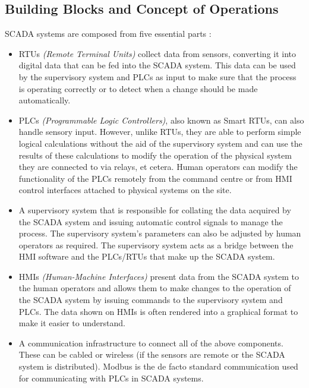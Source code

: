 \subsection{Building Blocks and Concept of Operations}
SCADA systems are composed from five essential parts \citep{site:allaboutcircuits:scadaintro:20150831,site:infosecinst:scadacritical:20130222}:
\begin{itemize}
  \item RTUs \textit{(Remote Terminal Units)} collect data from sensors, converting it into digital data that can be fed into the SCADA system. This data can be used by the supervisory system and PLCs as input to make sure that the process is operating correctly or to detect when a change should be made automatically.
  \item PLCs \textit{(Programmable Logic Controllers)}, also known as Smart RTUs, can also handle sensory input. However, unlike RTUs, they are able to perform simple logical calculations without the aid of the supervisory system and can use the results of these calculations to modify the operation of the physical system they are connected to via relays, et cetera. Human operators can modify the functionality of the PLCs remotely from the command centre or from HMI control interfaces attached to physical systems on the site.
  \item A supervisory system that is responsible for collating the data acquired by the SCADA system and issuing automatic control signals to manage the process. The supervisory system's parameters can also be adjusted by human operators as required. The supervisory system acts as a bridge between the HMI software and the PLCs/RTUs that make up the SCADA system.
  \item HMIs \textit{(Human-Machine Interfaces)} present data from the SCADA system to the human operators and allows them to make changes to the operation of the SCADA system by issuing commands to the supervisory system and PLCs. The data shown on HMIs is often rendered into a graphical format to make it easier to understand.
  \item A communication infrastructure to connect all of the above components. These can be cabled or wireless (if the sensors are remote or the SCADA system is distributed). Modbus is the de facto standard communication used for communicating with PLCs in SCADA systems.
\end{itemize}


